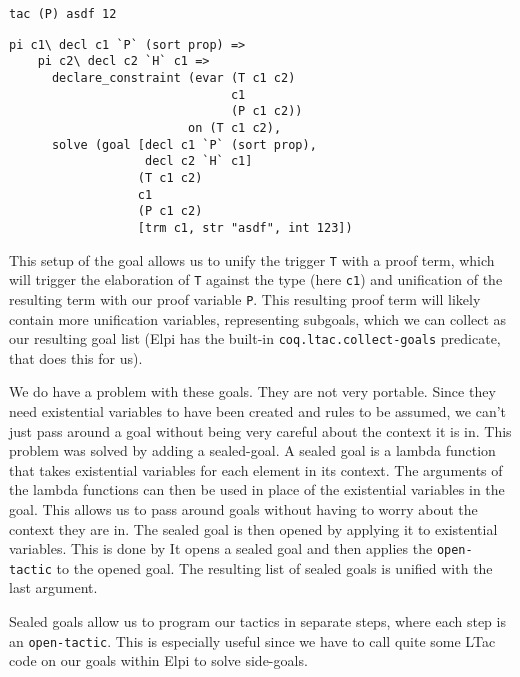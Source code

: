 \documentclass[thesis.tex]{subfiles}
\begin{document}
{{{\begin{minipage}[t]{0.2\linewidth}
\begin{verbatim}
tac (P) asdf 12
\end{verbatim}
\end{minipage}
\begin{minipage}[t]{0.45\linewidth}
  \begin{verbatim}
pi c1\ decl c1 `P` (sort prop) =>
    pi c2\ decl c2 `H` c1 =>
      declare_constraint (evar (T c1 c2) 
                               c1
                               (P c1 c2)) 
                         on (T c1 c2),
      solve (goal [decl c1 `P` (sort prop), 
                   decl c2 `H` c1] 
                  (T c1 c2)
                  c1 
                  (P c1 c2)
                  [trm c1, str "asdf", int 123])
\end{verbatim}
  \vspace{.1cm}
\end{minipage}

This setup of the goal allows us to unify the trigger \texttt{T} with a proof term, which will trigger the elaboration of \texttt{T} against the type (here \texttt{c1}) and unification of the resulting term with our proof variable \texttt{P}. This resulting proof term will likely contain more unification variables, representing subgoals, which we can collect as our resulting goal list (Elpi has the built-in \texttt{coq.ltac.collect-goals} predicate, that does this for us).

We do have a problem with these goals. They are not very portable. Since they need existential variables to have been created and rules to be assumed, we can't just pass around a goal without being very careful about the context it is in. This problem was solved by adding a sealed-goal. A sealed goal is a lambda function that takes existential variables for each element in its context. The arguments of the lambda functions can then be used in place of the existential variables in the goal. This allows us to pass around goals without having to worry about the context they are in. The sealed goal is then opened by applying it to existential variables. This is done by  It opens a sealed goal and then applies the \texttt{open-tactic} to the opened goal. The resulting list of sealed goals is unified with the last argument.

Sealed goals allow us to program our tactics in separate steps, where each step is an \texttt{open-tactic}. This is especially useful since we have to call quite some LTac code on our goals within Elpi to solve side-goals.

}}}
\end{document}
